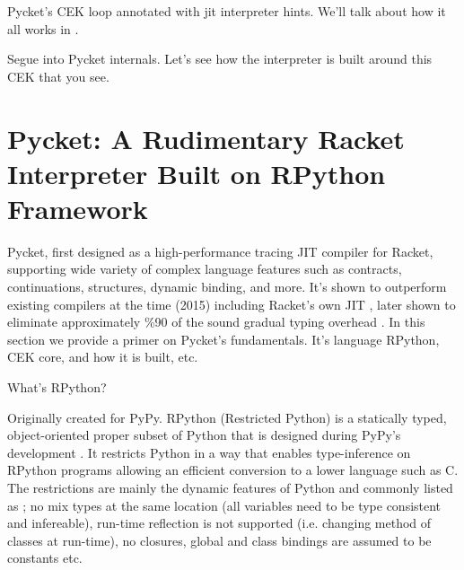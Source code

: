         \begin{figure-here}
            Pycket's CEK loop annotated with jit interpreter hints. We'll talk about how it all works in .
        \end{figure-here}

        \begin{paragraph-here}
            Segue into Pycket internals. Let's see how the interpreter is built around this CEK that you see.
        \end{paragraph-here}


    \section{Pycket: A Rudimentary Racket Interpreter Built on RPython Framework}
        \label{section:pycket-primer}

        \begin{paragraph-here}
            Pycket, first designed as a high-performance tracing JIT compiler for Racket, supporting wide variety of complex language features such as contracts, continuations, structures, dynamic binding, and more. It's shown to outperform existing compilers at the time (2015) including Racket's own JIT \cite{pycketmain}, later shown to eliminate approximately \%90 of the sound gradual typing overhead \cite{pycketmain2}. In this section we provide a primer on Pycket's fundamentals. It's language RPython, CEK core, and how it is built, etc.
        \end{paragraph-here}

        \begin{paragraph-here}
            What's RPython?

            Originally created for PyPy.
            RPython (Restricted Python) is a statically typed, object-oriented
            proper subset of Python that is designed during PyPy's development
            \cite{pypy06}. It restricts Python in a way that enables
            type-inference on RPython programs allowing an efficient conversion to
            a lower language such as C. The restrictions are mainly the dynamic
            features of Python and commonly listed as \cite{rpython07,rpython09};
            no mix types at the same location (all variables need to be type
            consistent and infereable), run-time reflection is not supported
            (i.e. changing method of classes at run-time), no closures, global and
            class bindings are assumed to be constants etc.
        \end{paragraph-here}

